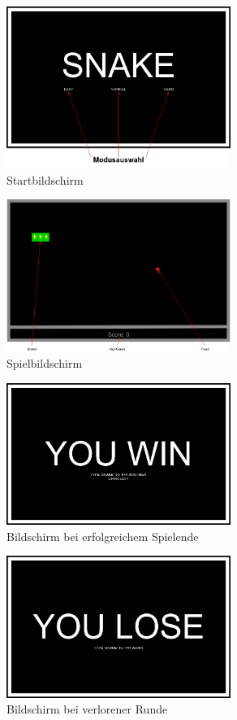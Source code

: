 \documentclass[a4paper,10pt]{article}
\begin{document}
			\begin{figure}[h]
				\centering
				\includegraphics[width=0.65\textwidth]{GUI_start}
				\caption{Startbildschirm}
				\label{GUI-Start}
			\end{figure}
			\begin{figure}[h]
				\centering
				\includegraphics[width=0.65\textwidth]{GUI_SKizze-gameplay}
				\caption{Spielbildschirm}
				\label{GUI-Gameplay}
			\end{figure}
			\newpage
			\begin{figure}[h]
				\centering
				\includegraphics[width=0.65\textwidth]{GUI_SKizze-win}
				\caption{Bildschirm bei erfolgreichem Spielende}
				\label{GUI-Win}
			\end{figure}
			\begin{figure}[h]
				\centering
				\includegraphics[width=0.65\textwidth]{GUI_SKizze-lose}
				\caption{Bildschirm bei verlorener Runde}
				\label{GUI-Lose}
			\end{figure}
			\newpage
\end{document}
